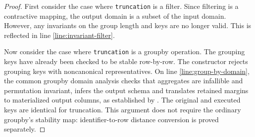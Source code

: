 \documentclass{article}
\begin{document}
\begin{proof}
    First consider the case where \texttt{truncation} is a filter.
    Since filtering is a contractive mapping,
    the output domain is a subset of the input domain.
    However, any invariants on the group length and keys are no longer valid.
    This is reflected in line \ref{line:invariant-filter}.

    Now consider the case where \texttt{truncation} is a groupby operation.
    The grouping keys have already been checked to be stable row-by-row.
    The constructor rejects grouping keys with noncanonical representatives.
    On line \ref{line:group-by-domain}, the common groupby domain analysis checks
    that aggregates are infallible and permutation invariant, infers the output
    schema and translates retained margins to materialized output columns,
    as established by
    .
    The original and executed keys are identical for truncation.
    This argument does not require the ordinary groupby's stability map:
    identifier-to-row distance conversion is proved separately.
\end{proof}
\end{document}
